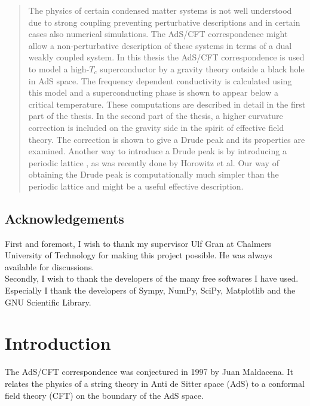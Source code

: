 \documentclass[12pt]{report}
\begin{document}
\begin{abstract}
The physics of certain condensed matter systems is not well understood due to strong coupling preventing perturbative descriptions and in certain cases also numerical simulations.
The AdS/CFT correspondence might allow a non-perturbative description of these systems in terms of a dual weakly coupled system. In this thesis the AdS/CFT correspondence is used to model a high-$T_c$ superconductor by a gravity theory outside a black hole in AdS space. The frequency dependent conductivity is calculated using this model and a superconducting phase is shown to appear below a critical temperature.
These computations are described in detail in the first part of the thesis. 
In the second part of the thesis, a higher curvature correction is included on the gravity side in the spirit of effective field theory.
The correction is shown to give a Drude peak and its properties are examined.
Another way to introduce a Drude peak is by introducing a periodic lattice \cite{horowitz}, as was recently done by Horowitz et al. Our way of obtaining the Drude peak is computationally much simpler than the periodic lattice and might be a useful effective description.
\end{abstract}

\section*{Acknowledgements}
First and foremost, I wish to thank my supervisor Ulf Gran at Chalmers University of Technology for making this project possible. He was always available for discussions.\\

Secondly, I wish to thank the developers of the many free softwares I have used. Especially I thank the developers of Sympy, NumPy, SciPy, Matplotlib and the GNU Scientific Library.


\tableofcontents
\chapter{Introduction}
The AdS/CFT correspondence was conjectured in 1997 by Juan Maldacena. It relates the physics of a string theory in Anti de Sitter space (AdS) to a conformal field theory (CFT) on the boundary of the AdS space.\\
\end{document}

